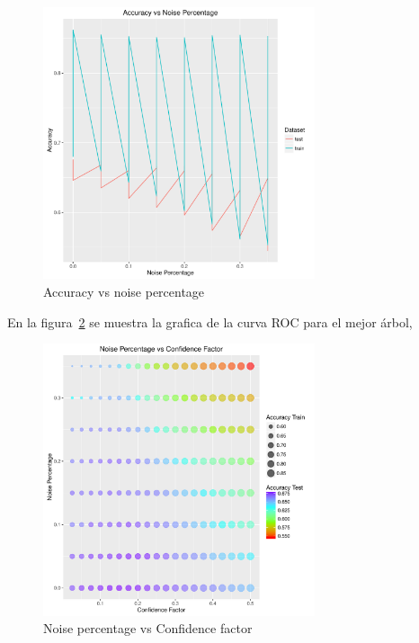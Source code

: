 \begin{figure}
  \centering
  \includegraphics[width = 8cm]{5c.pdf}
  \caption{Accuracy vs noise percentage}
  \label{fig:5c}
\end{figure}

En la figura~\ref{fig:5d} se muestra la grafica de la curva ROC para el mejor árbol,

\begin{figure}
  \centering
  \includegraphics[width = 8cm]{5d.pdf}
  \caption{Noise percentage vs Confidence factor}
  \label{fig:5d}
\end{figure}


